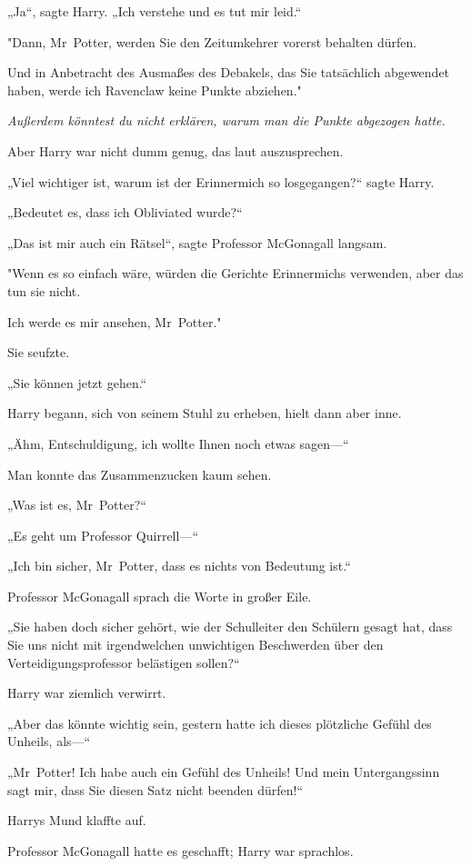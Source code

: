 {„Ja“, sagte Harry. „Ich verstehe und es tut mir leid.“

"Dann, Mr~Potter, werden Sie den Zeitumkehrer vorerst behalten dürfen.

Und in Anbetracht des Ausmaßes des Debakels, das Sie tatsächlich abgewendet haben, werde ich Ravenclaw keine Punkte abziehen."

\emph{Außerdem könntest du nicht erklären, warum man die Punkte abgezogen hatte.}

Aber Harry war nicht dumm genug, das laut auszusprechen.

„Viel wichtiger ist, warum ist der Erinnermich so losgegangen?“ sagte Harry.

„Bedeutet es, dass ich Obliviated wurde?“

„Das ist mir auch ein Rätsel“, sagte Professor McGonagall langsam.

"Wenn es so einfach wäre, würden die Gerichte Erinnermichs verwenden, aber das tun sie nicht.

Ich werde es mir ansehen, Mr~Potter."

Sie seufzte.

„Sie können jetzt gehen.“

Harry begann, sich von seinem Stuhl zu erheben, hielt dann aber inne.

„Ähm, Entschuldigung, ich wollte Ihnen noch etwas sagen—“

Man konnte das Zusammenzucken kaum sehen.

„Was ist es, Mr~Potter?“

„Es geht um Professor Quirrell—“

„Ich bin sicher, Mr~Potter, dass es nichts von Bedeutung ist.“

Professor McGonagall sprach die Worte in großer Eile.

„Sie haben doch sicher gehört, wie der Schulleiter den Schülern gesagt hat, dass Sie uns nicht mit irgendwelchen unwichtigen Beschwerden über den Verteidigungsprofessor belästigen sollen?“

Harry war ziemlich verwirrt.

„Aber das könnte wichtig sein, gestern hatte ich dieses plötzliche Gefühl des Unheils, als—“

„Mr~Potter! Ich habe auch ein Gefühl des Unheils! Und mein Untergangssinn sagt mir, dass Sie diesen Satz nicht beenden dürfen!“

Harrys Mund klaffte auf.

Professor McGonagall hatte es geschafft; Harry war sprachlos.

}
